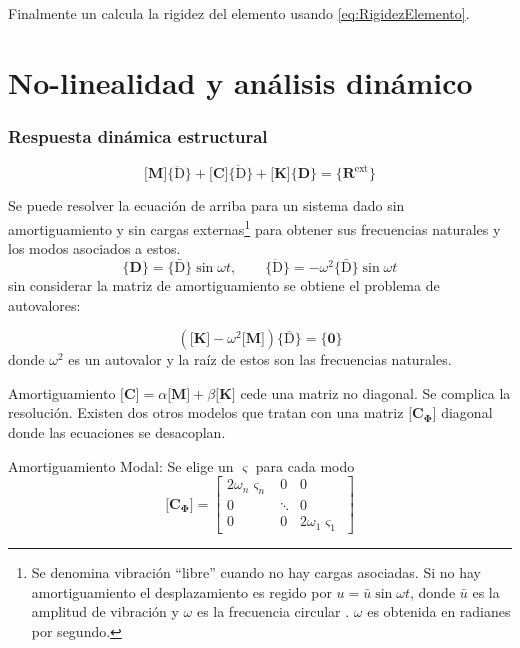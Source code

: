 \documentclass[11pt, a4paper,titlepage]{article}
\newcommand{\Phib}{\boldsymbol{\Phi}}
\newcommand{\Mme}[1]{\boldsymbol{[}\mathbf{#1} \boldsymbol{]}}
\newcommand{\Cme}[1]{\boldsymbol{\{ }\mathbf{#1} \boldsymbol{\}} }
\newcommand{\CD}{\Cme{D}}
\newcommand{\MK}{\Mme{K}}
\newcommand{\modal}{{_{\Phib}}}
\newcommand{\dampfact}{\varsigma}
\begin{document}
Finalmente un calcula la rigidez del elemento usando \eqref{eq:RigidezElemento}.






\part{No-linealidad y análisis dinámico}

\section{Respuesta dinámica estructural}

\begin{equation} \label{eq:ecuacionDinamicaGeneral}
	\Mme{M}\Cme{\boldsymbol{\ddot{\mathrm{D}}}} + \Mme{C}\Cme{\boldsymbol{\dot{\mathrm{D}}}}+\Mme{K} \Cme{D} =\Cme{R^{\mathrm{ext}}}
\end{equation}

Se puede resolver la ecuación de arriba para un sistema dado sin amortiguamiento y sin cargas externas\footnote{Se denomina vibración ``libre'' cuando no hay cargas asociadas. Si no hay amortiguamiento el desplazamiento es regido por $u= \bar{u}\sin \omega t$, donde $\bar{u}$ es la amplitud de vibración y $\omega$ es la frecuencia circular \cite{cook2007concepts}. $\omega$ es obtenida en radianes por segundo.} para obtener sus frecuencias naturales y los modos asociados a estos.
\[
\CD = \Cme{\boldsymbol{\bar{\mathrm D}}}\sin \omega t, \qquad \Cme{\boldsymbol{\ddot{\mathrm{D}}}}= -\omega^2 \Cme{\boldsymbol{\bar{\mathrm D}}} \sin \omega t
\]
sin considerar la matriz de amortiguamiento se obtiene el problema de autovalores:

\[
\left( \MK - \omega^2 \Mme{M} \right)\Cme{\boldsymbol{\bar{\mathrm D}}} = \Cme{0}
\]
donde $\omega^2$ es un autovalor y la raíz de estos son las frecuencias naturales.




Amortiguamiento $\Mme{C} = \alpha \Mme{M}+\beta \Mme{K}$ cede una matriz no diagonal. Se complica la resolución. Existen dos otros modelos que tratan con una matriz $\Mme{C\modal}$ diagonal donde las ecuaciones se desacoplan.


Amortiguamiento Modal: Se elige un $\dampfact$ para cada modo
\begin{equation}
\Mme{C\modal}=\left[ \begin{array}{ccc}{2 \omega_{n} \dampfact_{n}} & {0} & {0} \\ {0} & {\ddots} & {0} \\ {0} & {0} & {2 \omega_{1} \dampfact_{1}}\end{array}\right]
\end{equation}
\end{document}
